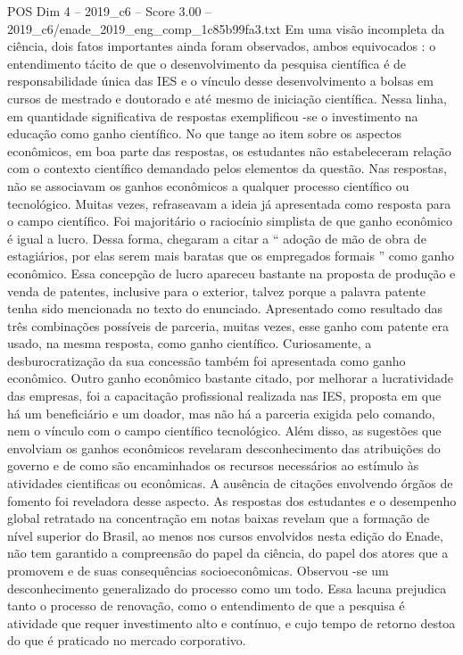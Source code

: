 \begin{textsample}{POS Dim 4 – 2019\_c6 – Score 3.00 – 2019\_c6/enade\_2019\_eng\_comp\_1c85b99fa3.txt}
Em uma visão incompleta da ciência, dois fatos importantes ainda foram observados, ambos equivocados : o entendimento tácito de que o desenvolvimento da pesquisa científica é de responsabilidade única das IES e o vínculo desse desenvolvimento a bolsas em cursos de mestrado e doutorado e até mesmo de iniciação científica.
Nessa linha, em quantidade significativa de respostas exemplificou -se o investimento na educação como ganho científico.
No que tange ao item sobre os aspectos econômicos, em boa parte das respostas, os estudantes não estabeleceram relação com o contexto científico demandado pelos elementos da questão.
Nas respostas, não se associavam os ganhos econômicos a qualquer processo científico ou tecnológico.
Muitas vezes, refraseavam a ideia já apresentada como resposta para o campo científico.
Foi majoritário o raciocínio simplista de que ganho econômico é igual a lucro.
Dessa forma, chegaram a citar a “ adoção de mão de obra de estagiários, por elas serem mais baratas que os empregados formais ” como ganho econômico.
Essa concepção de lucro apareceu bastante na proposta de produção e venda de patentes, inclusive para o exterior, talvez porque a palavra patente tenha sido mencionada no texto do enunciado.
Apresentado como resultado das três combinações possíveis de parceria, muitas vezes, esse ganho com patente era usado, na mesma resposta, como ganho científico.
Curiosamente, a desburocratização da sua concessão também foi apresentada como ganho econômico.
Outro ganho econômico bastante citado, por melhorar a lucratividade das empresas, foi a capacitação profissional realizada nas IES, proposta em que há um beneficiário e um doador, mas não há a parceria exigida pelo comando, nem o vínculo com o campo científico tecnológico.
Além disso, as sugestões que envolviam os ganhos econômicos revelaram desconhecimento das atribuições do governo e de como são encaminhados os recursos necessários ao estímulo às atividades cientificas ou econômicas.
A ausência de citações envolvendo órgãos de fomento foi reveladora desse aspecto.
As respostas dos estudantes e o desempenho global retratado na concentração em notas baixas revelam que a formação de nível superior do Brasil, ao menos nos cursos envolvidos nesta edição do Enade, não tem garantido a compreensão do papel da ciência, do papel dos atores que a promovem e de suas consequências socioeconômicas.
Observou -se um desconhecimento generalizado do processo como um todo.
Essa lacuna prejudica tanto o processo de renovação, como o entendimento de que a pesquisa é atividade que requer investimento alto e contínuo, e cujo tempo de retorno destoa do que é praticado no mercado corporativo.

\end{textsample}
